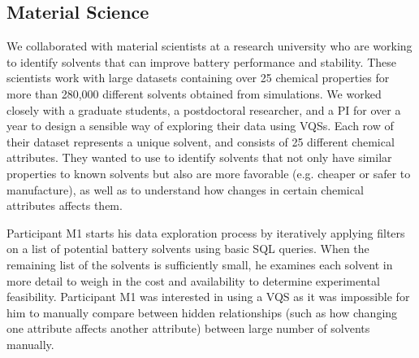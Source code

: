 \subsection{Material Science}
\par We collaborated with material scientists at a research university who are working to identify solvents that can improve battery performance and stability. These scientists work with large datasets containing over 25 chemical properties for more than 280,000 different solvents obtained from simulations. We worked closely with a graduate students, a postdoctoral researcher, and a PI for over a year to design a sensible way of exploring their data using VQSs. Each row of their dataset represents a unique solvent, and consists of 25 different chemical attributes. They wanted to use \zv to identify solvents that not only have similar properties to known solvents but also are more favorable (e.g. cheaper or safer to manufacture), as well as to understand how changes in certain chemical attributes affects them.
\par Participant M1 starts his data exploration process by iteratively applying filters on a list of potential battery solvents using basic SQL queries. When the remaining list of the solvents is sufficiently small, he examines each solvent in more detail to weigh in the cost and availability to determine experimental feasibility. Participant M1 was interested in using a VQS as it was impossible for him to manually compare between hidden relationships (such as how changing one attribute affects another attribute) between large number of solvents manually.
